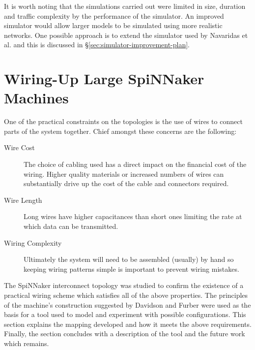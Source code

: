 			It is worth noting that the simulations carried out were limited in size,
			duration and traffic complexity by the performance of the simulator. An
			improved simulator would allow larger models to be simulated using more
			realistic networks. One possible approach is to extend the simulator used
			by Navaridas et al. and this is discussed in
			\S\ref{sec:simulator-improvement-plan}.
		
	
	\section{Wiring-Up Large SpiNNaker Machines}
		
		\label{sec:wiring-up-large-spinnaker-machines}
		
		One of the practical constraints on the topologies is the use of wires to
		connect parts of the system together.  Chief amongst these concerns are the
		following:
		
		\begin{description}
			
			\item[Wire Cost] The choice of cabling used has a direct impact on the
			financial cost of the wiring. Higher quality materials or increased
			numbers of wires can substantially drive up the cost of the cable and
			connectors required.
			
			\item[Wire Length] Long wires have higher capacitances than short ones
			limiting the rate at which data can be transmitted.
			
			\item[Wiring Complexity] Ultimately the system will need to be assembled
			(usually) by hand so keeping wiring patterns simple is important to
			prevent wiring mistakes.
			
		\end{description}
		
		The SpiNNaker interconnect topology was studied to confirm the existence of
		a practical wiring scheme which satisfies all of the above properties. The
		principles of the machine's construction suggested by Davidson
		\cite{davidsonWiring} and Furber \cite{furber13email} were used as the basis
		for a tool used to model and experiment with possible configurations. This
		section explains the mapping developed and how it meets the above
		requirements. Finally, the section concludes with a description of the tool
		and the future work which remains.
		

